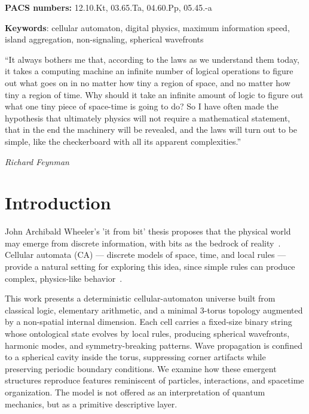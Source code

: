 \documentclass{ijuc}
\begin{document}
\vfill
\begin{center}
\textbf{PACS numbers: }12.10.Kt, 03.65.Ta, 04.60.Pp, 05.45.-a
\par\end{center}
\begin{center}
\textbf{Keywords}: cellular automaton, digital physics, maximum information speed, island aggregation, non-signaling, spherical wavefronts
\par\end{center}
\newpage
\epigraph{``It always bothers me that, according to the laws as we understand them today, it takes a computing machine an infinite number of logical operations to figure out what goes on in no matter how tiny a region of space, and no matter how tiny a region of time. Why should it take an infinite amount of logic to figure out what one tiny piece of space-time is going to do? So I have often made the hypothesis that ultimately physics will not require a mathematical statement, that in the end the machinery will be revealed, and the laws will turn out to be simple, like the checkerboard with all its apparent complexities.''}{\textit{Richard Feynman}}
\section{Introduction}
John Archibald Wheeler's 'it from bit' thesis proposes that the physical world may emerge from discrete information, with bits as the bedrock of reality~\cite{wheeler}. Cellular automata (CA) --- discrete models of space, time, and local rules --- provide a natural setting for exploring this idea, since simple rules can produce complex, physics-like behavior~\cite{wolfram,zuse,fredkin}.

This work presents a deterministic cellular-automaton universe built from classical logic, elementary arithmetic, and a minimal 3-torus topology augmented by a non-spatial internal dimension. Each cell carries a fixed-size binary string whose ontological state evolves by local rules, producing spherical wavefronts, harmonic modes, and symmetry-breaking patterns. Wave propagation is confined to a spherical cavity inside the torus, suppressing corner artifacts while preserving periodic boundary conditions. We examine how these emergent structures reproduce features reminiscent of particles, interactions, and spacetime organization. The model is not offered as an interpretation of quantum mechanics, but as a primitive descriptive layer.
\end{document}
